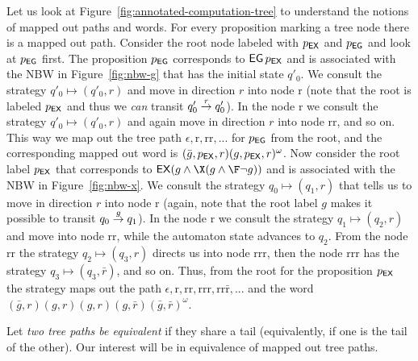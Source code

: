 \begin{example}
Let us look at Figure~\ref{fig:annotated-computation-tree}
to understand the notions of mapped out paths and words.
For every proposition marking a tree node there is a mapped out path.
Consider the root node labeled with $p_{\operatorname{\mathsf{EX}}}$ and $p_{\operatorname{\mathsf{EG}}}$
and look at $p_{\operatorname{\mathsf{EG}}}$ first.
The proposition $p_{\operatorname{\mathsf{EG}}}$ corresponds to $\operatorname{\mathsf{EG}} p_{\operatorname{\mathsf{EX}}}$
and is associated with the NBW in Figure~\ref{fig:nbw-g}
that has the initial state $q'_0$.
We consult the strategy $q'_0 \mapsto (q'_0,r)$
and move in direction $r$ into node $\mathrm r$
(note that the root is labeled $p_{\operatorname{\mathsf{EX}}}$ and thus we \emph{can} transit $q'_0 \stackrel{{r}}{\rightarrow} q'_0$).
In the node $\mathrm r$ we consult the strategy $q'_0 \mapsto (q'_0,r)$
and again move in direction $r$ into node $\mathrm{rr}$, and so on.
This way we map out the tree path $\epsilon, \mathrm{r}, \mathrm{rr}, ...$
for $p_{\operatorname{\mathsf{EG}}}$ from the root,
and the corresponding mapped out word is $(\bar g,p_{\operatorname{\mathsf{EX}}},r) (g,p_{\operatorname{\mathsf{EX}}},r)^\omega$.
Now consider the root label $p_{\operatorname{\mathsf{EX}}}$ that corresponds to $\EX(g \land \X(g \land \F\neg g))$
and is associated with the NBW in Figure~\ref{fig:nbw-x}.
We consult the strategy $q_0 \mapsto (q_1,r)$
that tells us to move in direction $r$ into node $\mathrm{r}$
(again, note that the root label $g$ makes it possible to transit $q_0 \stackrel{{g}}{\rightarrow} q_1$).
In the node $\mathrm r$ we consult the strategy $q_1 \mapsto (q_2,r)$ and move into node $\mathrm{rr}$,
while the automaton state advances to $q_2$.
From the node $\mathrm{rr}$ the strategy $q_2 \mapsto (q_3,r)$ directs us into node $\mathrm{rrr}$,
then the node $\mathrm{rrr}$ has the strategy $q_3 \mapsto (q_3,\bar r)$, and so on.
Thus, from the root for the proposition $p_{\operatorname{\mathsf{EX}}}$ the strategy maps out the path
$\epsilon, \mathrm{r}, \mathrm{rr}, \mathrm{rrr}, \mathrm{rr\bar r}, ...$
and the word $(\bar g, r)(g,r)(g,r)(g,\bar r)(\bar g,\bar r)^\omega$.
\end{example}


Let \emph{two tree paths be equivalent} if they share a tail
(equivalently, if one is the tail of the other).
Our interest will be in equivalence of mapped out tree paths.

